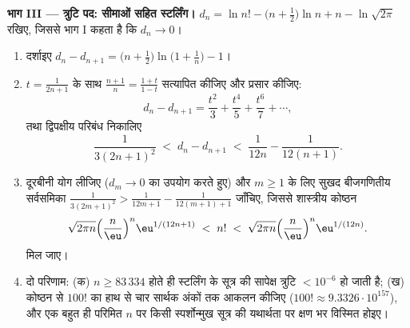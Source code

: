 \begin{problem}
\medskip
\noindent\textbf{भाग III --- त्रुटि पद: सीमाओं सहित स्टर्लिंग।}
$d_n = \ln n! - \bigl(n + \tfrac12\bigr)\ln n + n -
\ln\sqrt{2\pi}$ रखिए, जिससे भाग I कहता है कि $d_n \to 0$।
\begin{enumerate}[resume]
  \item दर्शाइए $d_n - d_{n+1} = \bigl(n +
        \tfrac12\bigr)\ln\bigl(1 + \tfrac1n\bigr) - 1$।
  \item $t = \frac1{2n+1}$ के साथ $\frac{n+1}n =
        \frac{1+t}{1-t}$ सत्यापित कीजिए और प्रसार कीजिए:
        \[
        d_n - d_{n+1} = \frac{t^2}3 + \frac{t^4}5 +
        \frac{t^6}7 + \cdots,
        \]
        तथा द्विपक्षीय परिबंध निकालिए
        \[
        \frac1{3(2n+1)^2} \;<\; d_n - d_{n+1} \;<\;
        \frac1{12n} - \frac1{12(n+1)} .
        \]
  \item दूरबीनी योग लीजिए ($d_m \to 0$ का उपयोग करते हुए) और $m \geq 1$ के
        लिए सुखद बीजगणितीय सर्वसमिका $\frac1{3(2m+1)^2} >
        \frac1{12m+1} - \frac1{12(m+1)+1}$ जाँचिए, जिससे
        शास्त्रीय कोष्ठन
        \[
        \sqrt{2\pi n}\Bigl(\frac n\eu\Bigr)^n
        \eu^{1/(12n+1)} \;<\; n! \;<\;
        \sqrt{2\pi n}\Bigl(\frac n\eu\Bigr)^n\eu^{1/(12n)} .
        \]
        मिल जाए।
  \item दो परिणाम: (क) $n \geq 83\,334$ होते ही स्टर्लिंग के सूत्र की
        सापेक्ष त्रुटि $< 10^{-6}$ हो जाती है; (ख) कोष्ठन से $100!$ का
        हाथ से चार सार्थक अंकों तक आकलन कीजिए ($100! \approx 9.3326\cdot
        10^{157}$), और एक बहुत
        ही परिमित $n$ पर किसी स्पर्शोन्मुख सूत्र की यथार्थता पर
        क्षण भर विस्मित होइए।
\end{enumerate}


\end{problem}
